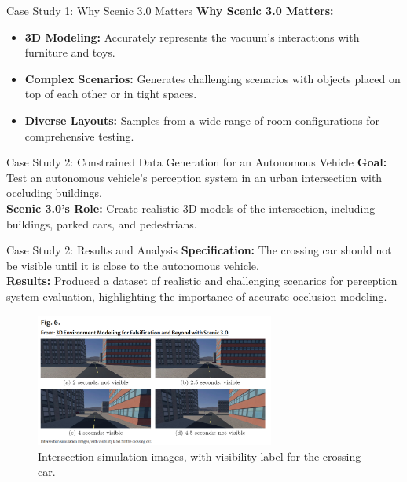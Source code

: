 \documentclass[10pt]{beamer}
\begin{document}
\begin{frame}{Case Study 1: Why Scenic 3.0 Matters}
  \textbf{Why Scenic 3.0 Matters:}
  \begin{itemize}
\item \textbf{3D Modeling:} Accurately represents the vacuum's interactions with furniture and toys.
\item \textbf{Complex Scenarios:} Generates challenging scenarios with objects placed on top of each other or in tight spaces.
\item \textbf{Diverse Layouts:} Samples from a wide range of room configurations for comprehensive testing.
  \end{itemize}
\end{frame}

\begin{frame}{Case Study 2: Constrained Data Generation for an Autonomous Vehicle}
\textbf{Goal:} Test an autonomous vehicle's perception system in an urban intersection with occluding buildings.\\
\textbf{Scenic 3.0's Role:} Create realistic 3D models of the intersection, including buildings, parked cars, and pedestrians.
\end{frame}

\begin{frame}{Case Study 2: Results and Analysis}
  \textbf{Specification:} The crossing car should not be visible until it is close to the autonomous vehicle.\\
\textbf{Results:} Produced a dataset of realistic and challenging scenarios for perception system evaluation, highlighting the importance of accurate occlusion modeling.

\begin{figure}
\centering
\includegraphics[width=0.7\textwidth]{FIG6.png}
\caption{Intersection simulation images, with visibility label for the crossing car.}
\label{fig:intersection}
\end{figure}
\end{frame}
\end{document}
